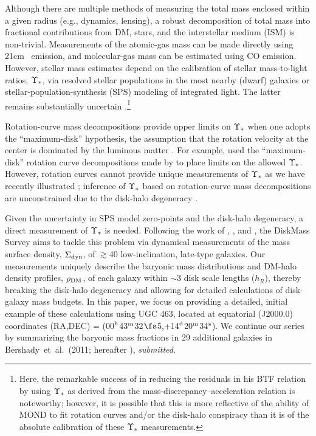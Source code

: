 \documentclass[apj,iop,numberedappendix]{emulateapj}
\begin{document}
Although there are multiple methods of measuring the total mass enclosed within
a given radius (e.g., dynamics, lensing), a robust decomposition of total mass
into fractional contributions from DM, stars, and the interstellar medium (ISM)
is non-trivial.  Measurements of the atomic-gas mass can be made directly using
21cm \hone\ emission, and molecular-gas mass can be estimated using CO emission.
However, stellar mass estimates depend on the calibration of stellar
mass-to-light ratios, $\Upsilon_\ast$, via resolved stellar populations in the most
nearby (dwarf) galaxies or stellar-population-synthesis (SPS) modeling of
integrated light.  The latter remains substantially uncertain
\citep{2009ApJ...699..486C, 2010ApJ...708...58C, 2010ApJ...712..833C}.\footnote{
%
Here, the remarkable success of \citet{2005ApJ...632..859M} in reducing the
residuals in his BTF relation by using $\Upsilon_\ast$ as derived from the
mass-discrepancy--acceleration relation \citep{2004ApJ...609..652M} is
noteworthy; however, it is possible that this is more reflective of the ability
of MOND \citep{1983ApJ...270..365M} to fit rotation curves and/or the disk-halo
conspiracy than it is of the absolute calibration of these $\Upsilon_\ast$ measurements.
%
}

Rotation-curve mass decompositions provide upper limits on $\Upsilon_\ast$ when one
adopts the ``maximum-disk'' hypothesis, the assumption that the rotation
velocity at the center is dominated by the luminous matter
.  For example, \citet{2001ApJ...550..212B} used
the ``maximum-disk'' rotation curve decompositions made by \citet[][hereafter
]{2001ApJ...563..694V} to place limits on the
allowed $\Upsilon_\ast$.  However, rotation curves cannot provide unique measurements of
$\Upsilon_\ast$ as we have recently illustrated \citep[][hereafter
]{2010ApJ...716..198B}; inference of $\Upsilon_\ast$
based on rotation-curve mass decompositions are unconstrained due to the
disk-halo degeneracy \citep{1985ApJ...295..305V}.

Given the uncertainty in SPS model zero-points and the disk-halo degeneracy, a
direct measurement of $\Upsilon_\ast$ is needed.  Following the work of
\citet{1984ApJ...284L..35B}, \citet{1984ApJ...278...81V, 1986ApJ...303..556V},
and \citet{1993A&A...275...16B}, the DiskMass Survey
 aims to tackle this problem via
dynamical measurements of the mass surface density, $\Sigma_{\rm dyn}$, of $\gtrsim$40
low-inclination, late-type galaxies.  Our measurements uniquely describe the
baryonic mass distributions and DM-halo density profiles, $\rho_{\rm DM}$, of each
galaxy within $\sim$3 disk scale lengths ($h_R$), thereby breaking the disk-halo
degeneracy and allowing for detailed calculations of disk-galaxy mass budgets.
In this paper, we focus on providing a detailed, initial example of these
calculations using UGC 463, located at equatorial (J2000.0) coordinates (RA,DEC)
= (00$^{\rm h}$43$^{\rm m}$32$\fs$5,+14$^{\rm d}$20$^{\rm m}$34$^{\rm s}$).  We
continue our series by summarizing the baryonic mass fractions in 29 additional
galaxies in Bershady~et~al.~(2011; hereafter \pV), {\it submitted}.
\end{document}

